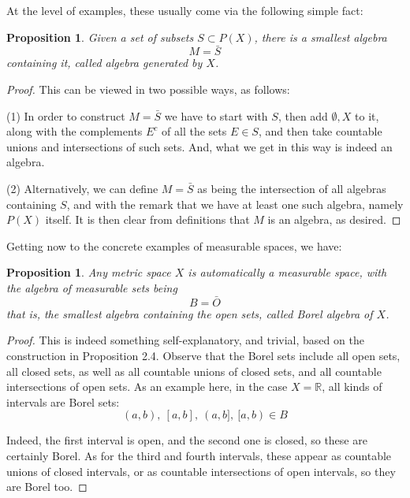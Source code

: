 \documentclass[12pt]{amsbook}
\newtheorem{proposition}[theorem]{Proposition}
\begin{document}
\bigskip

At the level of examples, these usually come via the following simple fact:

\begin{proposition}
Given a set of subsets $S\subset P(X)$, there is a smallest algebra
$$M=\bar{S}$$
containing it, called algebra generated by $X$.
\end{proposition}

\begin{proof}
This can be viewed in two possible ways, as follows:

\medskip

(1) In order to construct $M=\bar{S}$ we have to start with $S$, then add $\emptyset,X$ to it, along with the complements $E^c$ of all the sets $E\in S$, and then take countable unions and intersections of such sets. And, what we get in this way is indeed an algebra.

\medskip

(2) Alternatively, we can define $M=\bar{S}$ as being the intersection of all algebras containing $S$, and with the remark that we have at least one such algebra, namely $P(X)$ itself. It is then clear from definitions that $M$ is an algebra, as desired.
\end{proof}

Getting now to the concrete examples of measurable spaces, we have:


\begin{proposition}
Any metric space $X$ is automatically a measurable space, with the algebra of measurable sets being 
$$B=\bar{O}$$
that is, the smallest algebra containing the open sets, called Borel algebra of $X$.
\end{proposition}

\begin{proof}
This is indeed something self-explanatory, and trivial, based on the construction in Proposition 2.4. Observe that the Borel sets include all open sets, all closed sets, as well as all countable unions of closed sets, and all countable intersections of open sets. As an example here, in the case $X=\mathbb R$, all kinds of intervals are Borel sets:
$$(a,b),\ [a,b],\ (a,b],\ [a,b)\in B$$

Indeed, the first interval is open, and the second one is closed, so these are certainly Borel. As for the third and fourth intervals, these appear as countable unions of closed intervals, or as countable intersections of open intervals, so they are Borel too.
\end{proof}
\end{document}
